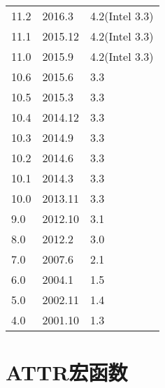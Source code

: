 \begin{center}  
\tablelasttail{\bottomrule}

\begin{supertabular}{p{2.cm}p{2.cm}m{11.cm}}
      11.2 & 2016.3 & 4.2(Intel 3.3)\\
      11.1 & 2015.12 & 4.2(Intel 3.3)\\
      11.0 & 2015.9 & 4.2(Intel 3.3)\\
      10.6 & 2015.6 & 3.3\\
      10.5 & 2015.3 & 3.3\\
      10.4 & 2014.12 & 3.3\\
      10.3 & 2014.9 & 3.3\\
      10.2 & 2014.6 & 3.3\\
      10.1 & 2014.3 & 3.3\\
      10.0 & 2013.11 & 3.3\\
      9.0 & 2012.10 & 3.1\\
      8.0 & 2012.2 & 3.0\\
      7.0 & 2007.6 & 2.1\\
      6.0 & 2004.1 & 1.5\\
      5.0 & 2002.11 & 1.4\\
      4.0 & 2001.10 & 1.3\\
\end{supertabular}
\end{center}


\chapter{ATTR宏函数}
\label{cha:attr}

